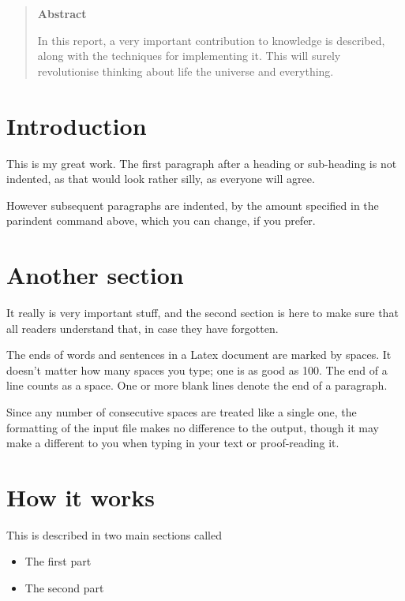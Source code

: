 \begin{quotation}

\begin{center}
{\large \bf Abstract}
\end{center}

\noindent
In this report, a very important contribution to knowledge is described,
along with the techniques for implementing it. This will surely
revolutionise thinking about life the universe and everything.
\end{quotation}

\parindent 7mm

\parskip 1mm

\section{Introduction}
This is my great work. The first paragraph after a heading or
sub-heading is not indented, as that would look rather silly, as
everyone will agree.

However subsequent paragraphs are indented, by the amount specified in
the parindent command above, which you can change, if you prefer.

\section{Another section}

It really is very important stuff, and the second section is here to
make sure that all readers understand that, in case they have forgotten.

The ends  of words and sentences in a Latex document are marked
  by   spaces. It  doesn't matter how many
spaces    you type; one is as good as 100.  The
end of   a line counts as a space.
One   or more   blank lines denote the  end
of  a paragraph.

Since any number of consecutive spaces are treated
like a single one, the formatting of the input
file makes no difference to the output, though it may make a different
to you when typing in your text or proof-reading it.


\section{How it works}

This is described in two main sections called
\begin{itemize}

\item The first part

\item The second part
\end{itemize}

